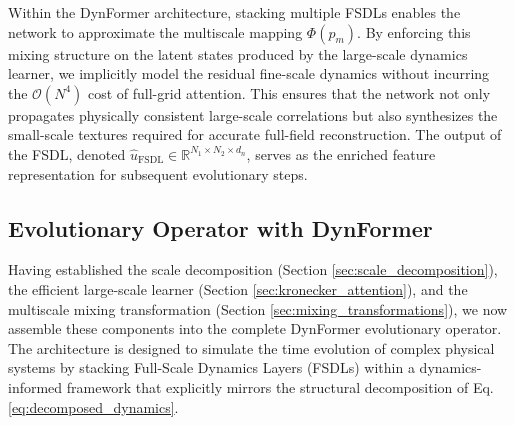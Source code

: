 \documentclass[final,3p,times]{elsarticle}
\begin{document}
Within the DynFormer architecture, stacking multiple FSDLs enables the network to approximate the multiscale mapping $\Phi(p_m)$. By enforcing this mixing structure on the latent states produced by the large-scale dynamics learner, we implicitly model the residual fine-scale dynamics without incurring the $\mathcal{O}(N^4)$ cost of full-grid attention. This ensures that the network not only propagates physically consistent large-scale correlations but also synthesizes the small-scale textures required for accurate full-field reconstruction. The output of the FSDL, denoted $\hat{u}_{\text{FSDL}} \in \mathbb{R}^{N_1 \times N_2 \times d_{n}}$, serves as the enriched feature representation for subsequent evolutionary steps.


\subsection{Evolutionary Operator with DynFormer}\label{sec:dynformer_operator}
Having established the scale decomposition (Section \ref{sec:scale_decomposition}), the efficient large-scale learner (Section \ref{sec:kronecker_attention}), and the multiscale mixing transformation (Section \ref{sec:mixing_transformations}), we now assemble these components into the complete DynFormer evolutionary operator. The architecture is designed to simulate the time evolution of complex physical systems by stacking Full-Scale Dynamics Layers (FSDLs) within a dynamics-informed framework that explicitly mirrors the structural decomposition of Eq. \eqref{eq:decomposed_dynamics}.
\end{document}
